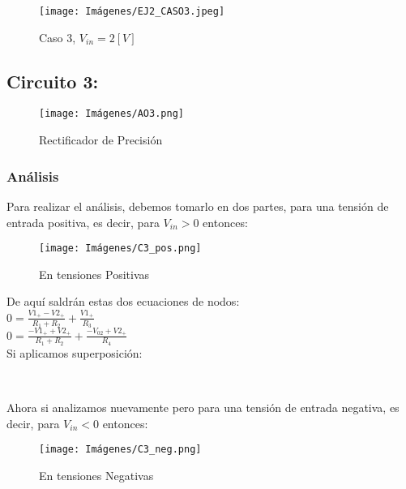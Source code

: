         \begin{figure}[H]
        	\centering
        	\texttt{[image: Imágenes/EJ2\_CASO3.jpeg]}
        	\caption{Caso 3, $V_{in} = 2 [V]$}
        \end{figure}
        
    \subsection{Circuito 3:}
        \begin{figure}[ht]
        	\centering
        	\texttt{[image: Imágenes/AO3.png]}
        	\caption{Rectificador de Precisión}
        \end{figure}
        
        \subsubsection{Análisis}
        Para realizar el análisis, debemos tomarlo en dos partes, para una tensión de entrada positiva, es decir, para \textbf{$V_{in}>0$} entonces:\\
        
        \begin{figure}[ht]
        	\centering
        	\texttt{[image: Imágenes/C3\_pos.png]}
        	\caption{En tensiones Positivas}
        \end{figure}
        
        De aquí saldrán estas dos ecuaciones de nodos:\\
        
        $0 = \frac{V1_{+} - V2_{+}}{R_{1} + R_{2}} + \frac{V1_{+}}{R_{3}}$\\
        
        $0 = \frac{-V1_{+} + V2_{+}}{R_{1} + R_{2}} + \frac{-V_{02} + V2_{+}}{R_{4}}$\\

        Si aplicamos superposición:\\

        \begin{center}
            \\
        \end{center}
        
        Ahora si analizamos nuevamente pero para una tensión de entrada negativa, es decir, para \textbf{$V_{in}<0$} entonces:\\
        \begin{figure}[ht]
        	\centering
        	\texttt{[image: Imágenes/C3\_neg.png]}
        	\caption{En tensiones Negativas}
        \end{figure}

